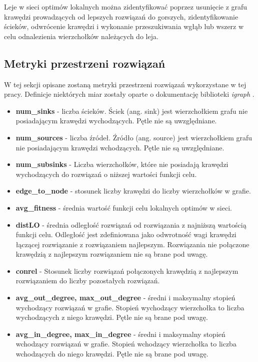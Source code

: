 Leje w sieci optimów lokalnych można zidentyfikować poprzez usunięcie z grafu krawędzi prowadzących od lepszych rozwiązań do gorszych,
zidentyfikowanie ścieków, odwrócenie krawędzi i wykonanie przeszukiwania wgłąb lub wszerz w celu odnalezienia wierzchołków należących do leja.
\subsection{Metryki przestrzeni rozwiązań} \label{sec:metrics}
W tej sekcji opisane zostaną metryki przestrzeni rozwiązań wykorzystane w tej pracy.
Definicje niektórych miar zostały oparte o dokumentację biblioteki \textit{igraph} \cite{igraphdocs}.
\begin{itemize}
      \item \textbf{num\_sinks} - liczba ścieków. Ściek (ang. sink) jest wierzchołkiem grafu nie posiadającym krawędzi wychodzących.
            Pętle nie są uwzględniane.
      \item \textbf{num\_sources} - liczba źródeł. Źródło (ang. source) jest wierzchołkiem grafu nie posiadającym krawędzi wchodzących.
            Pętle nie są uwzględniane.
      \item \textbf{num\_subsinks} - Liczba wierzchołków, które nie posiadają krawędzi wychodzących do rozwiązań o niższej wartości funkcji celu.
      \item \textbf{edge\_to\_node} - stosunek liczby krawędzi do liczby wierzchołków w grafie.
      \item \textbf{avg\_fitness} - średnia wartość funkcji celu lokalnych optimów w sieci.
      \item \textbf{distLO} - średnia odległość rozwiązań od rozwiązania z najniższą wartością funkcji celu. Odległość jest zdefiniowana jako odwrotność wagi krawędzi łączącej rozwiązanie z rozwiązaniem najlepszym.
            Rozwiązania nie połączone krawędzią z najlepszym rozwiązaniem nie są brane pod uwagę.
      \item \textbf{conrel} - Stosunek liczby rozwiązań połączonych krawędzią z najlepszym rozwiązaniem do liczby pozostałych rozwiązań.
      \item \textbf{avg\_out\_degree, max\_out\_degree} - średni i maksymalny stopień wychodzący rozwiązań w grafie. Stopień wychodzący wierzchołka to liczba wychodzących z niego krawędzi. Pętle nie są brane pod uwagę.
      \item \textbf{avg\_in\_degree, max\_in\_degree} - średni i maksymalny stopień wchodzący rozwiązań w grafie. Stopień wchodzący wierzchołka to liczba wchodzących do niego krawędzi. Pętle nie są brane pod uwagę.

\end{itemize}
